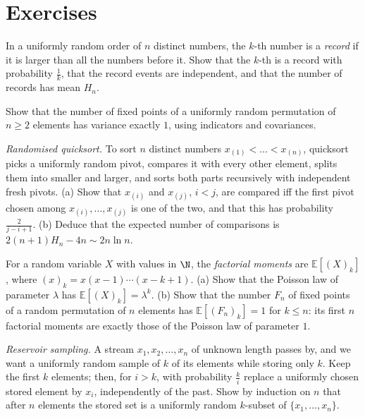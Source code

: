 \section{Exercises}

\begin{exercise}[$\star$]\label{ex:records}
In a uniformly random order of $n$ distinct numbers, the $k$-th number is a \emph{record} if it is larger than all
the numbers before it. Show that the $k$-th is a record with probability $\frac1k$, that the record events are
independent, and that the number of records has mean $H_n$.
\end{exercise}

\begin{exercise}[$\star$]\label{ex:fixedvar}
Show that the number of fixed points of a uniformly random permutation of $n\ge2$ elements has variance exactly $1$,
using indicators and covariances.
\end{exercise}

\begin{exercise}[$\star\star$]\label{ex:quicksort}
\emph{Randomised quicksort.} To sort $n$ distinct numbers $x_{(1)}<\dots<x_{(n)}$, quicksort picks a uniformly random
pivot, compares it with every other element, splits them into smaller and larger, and sorts both parts recursively
with independent fresh pivots. (a) Show that $x_{(i)}$ and $x_{(j)}$, $i<j$, are compared iff the first pivot chosen
among $x_{(i)},\dots,x_{(j)}$ is one of the two, and that this has probability $\frac2{j-i+1}$. (b) Deduce that the expected
number of comparisons is $2(n+1)H_n-4n\sim2n\ln n$.
\end{exercise}

\begin{exercise}[$\star\star$]\label{ex:factorial}
For a random variable $X$ with values in $\N$, the \emph{factorial moments} are $\mathbb E[(X)_k]$, where
$(x)_k=x(x-1)\cdots(x-k+1)$. (a) Show that the Poisson law of parameter $\lambda$ has $\mathbb E[(X)_k]=\lambda^k$. (b) Show that the
number $F_n$ of fixed points of a random permutation of $n$ elements has $\mathbb E[(F_n)_k]=1$ for $k\le n$: its first $n$
factorial moments are exactly those of the Poisson law of parameter $1$.
\end{exercise}

\begin{exercise}[$\star\star$]\label{ex:reservoir}
\emph{Reservoir sampling.} A stream $x_1,x_2,\dots,x_n$ of unknown length passes by, and we want a uniformly random
sample of $k$ of its elements while storing only $k$. Keep the first $k$ elements; then, for $i>k$, with probability
$\frac ki$ replace a uniformly chosen stored element by $x_i$, independently of the past. Show by induction on $n$ that
after $n$ elements the stored set is a uniformly random $k$-subset of $\{x_1,\dots,x_n\}$.
\end{exercise}

